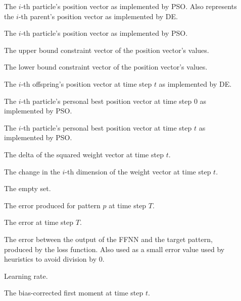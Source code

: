 \begin{description}
	\item [\parbox{2cm}{$\boldsymbol{x}_{i}$}] \parbox{12.5cm}{The $i$-th particle's position vector as implemented by \acs{PSO}. Also represents the $i$-th parent's position vector as implemented by \acs{DE}.}
	\item [\parbox{2cm}{$\boldsymbol{x}_{i}$}] \parbox{12.5cm}{The $i$-th particle's position vector as implemented by \acs{PSO}.}
	\item [\parbox{2cm}{$\boldsymbol{x}_{max}$}] \parbox{12.5cm}{The upper bound constraint vector of the position vector's values.}
	\item [\parbox{2cm}{$\boldsymbol{x}_{min}$}] \parbox{12.5cm}{The lower bound constraint vector of the position vector's values.}
	\item [\parbox{2cm}{$\boldsymbol{x}'_{i}(t)$}] \parbox{12.5cm}{The $i$-th offspring's position vector at time step $t$ as implemented by \acs{DE}.}
	\item [\parbox{2cm}{$\boldsymbol{y}_{i}(0)$}] \parbox{12.5cm}{The $i$-th particle's personal best position vector at time step $0$ as implemented by \acs{PSO}.}
	\item [\parbox{2cm}{$\boldsymbol{y}_{i}(t)$}] \parbox{12.5cm}{The $i$-th particle's personal best position vector at time step $t$ as implemented by \acs{PSO}.}
	\item [\parbox{2cm}{$\Delta \boldsymbol{w}^{2}_{t}$}] \parbox{12.5cm}{The delta of the squared weight vector at time step $t$.}
	\item [\parbox{2cm}{$\Delta w_{i}(t)$}] \parbox{12.5cm}{The change in the $i$-th dimension of the weight vector at time step $t$.}
	\item [\parbox{2cm}{$\emptyset$}] \parbox{12.5cm}{The empty set.}
	\item [\parbox{2cm}{$\epsilon_{T_{p}}$}] \parbox{12.5cm}{The error produced for pattern $p$ at time step $T$.}
	\item [\parbox{2cm}{$\epsilon_{T}$}] \parbox{12.5cm}{The error at time step $T$.}
	\item [\parbox{2cm}{$\epsilon$}] \parbox{12.5cm}{The error between the output of the \acs{FFNN} and the target pattern, produced by the loss function. Also used as a small error value used by heuristics to avoid division by 0.}
	\item [\parbox{2cm}{$\eta$}] \parbox{12.5cm}{Learning rate.}
	\item [\parbox{2cm}{$\hat{\boldsymbol{m}}_{t}$}] \parbox{12.5cm}{The bias-corrected first moment at time step $t$.}

\end{description}

